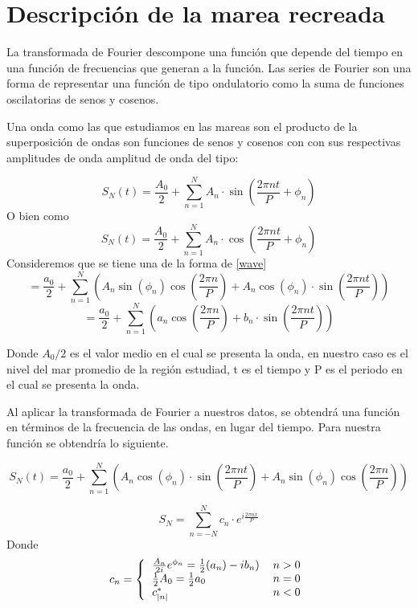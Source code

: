 \section{Descripción de la marea recreada}

La transformada de Fourier descompone una función que depende del tiempo en una función de frecuencias que generan a la función. Las series de Fourier son una forma de representar una función de tipo ondulatorio como la suma de funciones oscilatorias de senos y cosenos.

Una onda como las que estudiamos en las mareas son el producto de la superposición de ondas son funciones de senos y cosenos con con sus respectivas amplitudes de onda amplitud de onda  del tipo:

\begin{equation}
S_N(t) = \frac{A_0}{2} + \sum_{n=1}^{N} A_n\cdot\sin{(\frac{2\pi n t}{P}+ \phi_n)}
\label{wave}
\end{equation}
O bien como
\begin{equation}
S_N(t)=\frac{A_0}{2} + \sum_{n=1}^{N} A_n\cdot\cos{(\frac{2\pi n t}{P}+ \phi_n)}
\label{wavcos}
\end{equation}
Consideremos que se tiene una de la forma de \ref{wave}
$$= \frac{a_0}{2} + \sum_{n=1}^{N} \left(A_n\sin{(\phi_n)}\cos{(\frac{2 \pi n}{P})} +  A_n\cos{(\phi_n)}\cdot\sin{(\frac{2\pi n t}{P})} \right)$$
$$=\frac{a_0}{2} + \sum_{n=1}^{N} \left( a_n\cos{(\frac{2 \pi n}{P})} +  b_n\cdot\sin{(\frac{2\pi n t}{P})} \right)$$

Donde $A_0/2$ es el valor medio en el cual se presenta la onda, en nuestro caso es el nivel del mar promedio de la región estudiad, t es el tiempo y P es el periodo en el cual se presenta la onda.

Al aplicar la transformada de Fourier a nuestros datos, se obtendrá una función en términos de la frecuencia de las ondas, en lugar del tiempo. Para nuestra función se obtendría lo siguiente.

$$S_N(t) =  \frac{a_0}{2} + \sum_{n=1}^{N} \left( A_n\cos{(\phi_n)}\cdot\sin{(\frac{2\pi n t}{P})} + A_n\sin{(\phi_n)}\cos{(\frac{2 \pi n}{P})} \right)$$

\begin{equation}
S_N =\sum_{n=-N}^{N} c_n \cdot e^{i \frac{2\pi n x}{P}}
\end{equation}
Donde
\[ 
c_n = \left\{
  \begin{tabular}{ll}
  $\frac{A_n}{2i}e^{\phi_n} = \frac{1}{2} (a_n)- ib_n) $ & $ n >0$ \\
  $\frac{1}{2} A_0 = \frac{1}{2}a_0 $ & $ n=0 $\\
  $c_{|n|}^{*} $ & $ n<0 $ \\ 
  \end{tabular}
  \right.
\]

